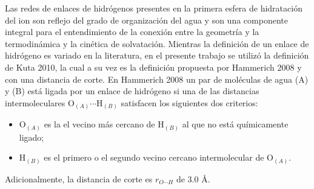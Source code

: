 Las redes de enlaces de hidr\'ogenos presentes en la primera esfera
de hidrataci\'on del ion son reflejo del grado de organizaci\'on del 
agua y son una componente integral para el entendimiento de la 
conexi\'on entre la geometr\'ia y la termodin\'amica y la cin\'etica
de solvataci\'on. Mientras la definici\'on de un enlace de 
hidr\'ogeno es variado en la literatura, en el presente trabajo se 
utiliz\'o la definici\'on de Kuta 2010, la cual a su vez es la 
definici\'on propuesta por Hammerich 2008 y con una distancia de 
corte. En Hammerich 2008 un par de mol\'eculas de agua (A) y (B) 
est\'a ligada por un enlace de hidr\'ogeno si una de las distancias 
intermoleculares O$_{(A)}$$\cdots$H$_{(B)}$ satisfacen los siguientes 
dos criterios: 
\begin{itemize}
\item O$_{(A)}$ es la el vecino m\'as cercano de H$_{(B)}$ al que no 
est\'a qu\'imicamente ligado;
\item H$_{(B)}$ es el primero o el segundo vecino cercano 
intermolecular de O$_{(A)}$. 
\end{itemize}
Adicionalmente, la distancia de corte es $r_{O\cdots H}$ de $3.0$ \AA.
